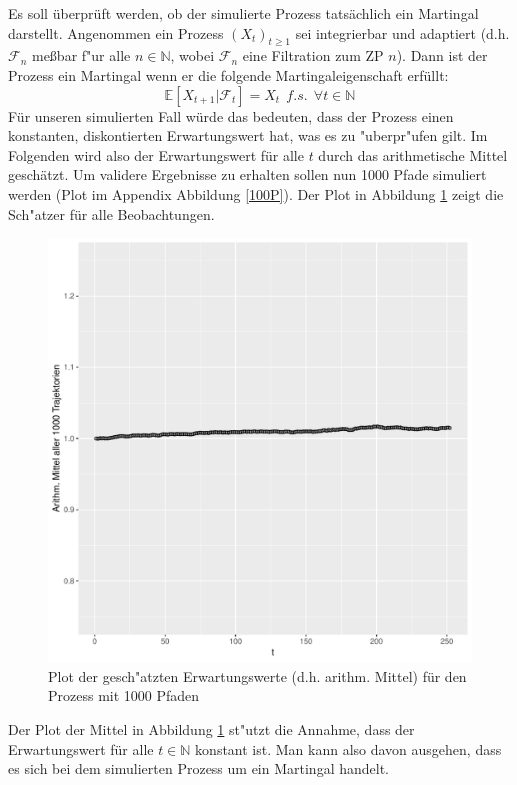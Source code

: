 \documentclass[10pt,a4paper]{report}\usepackage[]{graphicx}\usepackage[]{color}
\makeatletter
\def\maxwidth{ %
  \ifdim\Gin@nat@width>\linewidth
    \linewidth
  \else
    \Gin@nat@width
  \fi
}
\makeatother
\begin{document}
Es soll überprüft werden, ob der simulierte Prozess tatsächlich ein Martingal darstellt. Angenommen ein Prozess $(X_t)_{t\geq 1}$ sei integrierbar und adaptiert (d.h. $\mathcal{F}_n$ meßbar f"ur alle $n \in \mathbb{N}$, wobei $\mathcal{F}_n$ eine Filtration zum ZP $n$). Dann ist der Prozess ein Martingal wenn er die folgende Martingaleigenschaft erfüllt:
\[ \mathbb{E}[X_{t+1}| \mathcal{F}_t]=X_t \ \ f.s.\ \ \forall t \in \mathbb{N}\]
Für unseren simulierten Fall würde das bedeuten, dass der Prozess einen konstanten, diskontierten Erwartungswert hat, was es zu "uberpr"ufen gilt. Im Folgenden wird also der Erwartungswert für alle $t$ durch das arithmetische Mittel geschätzt. Um validere Ergebnisse zu erhalten sollen nun 1000 Pfade simuliert werden (Plot im Appendix Abbildung \ref{100P}). Der Plot in Abbildung \ref{EWfig} zeigt die Sch"atzer für alle Beobachtungen. 

\begin{figure}[H]

\includegraphics[width=\maxwidth]{figure/unnamed-chunk-15-1} 

\caption{Plot der gesch"atzten Erwartungswerte (d.h. arithm. Mittel) für den Prozess mit 1000 Pfaden}
\label{EWfig}
\end{figure}

Der Plot der Mittel in Abbildung \ref{EWfig} st"utzt die Annahme, dass der Erwartungswert für alle $t \in \mathbb{N}$ konstant ist. Man kann also davon ausgehen, dass es sich bei dem simulierten Prozess um ein Martingal handelt. 
\end{document}
